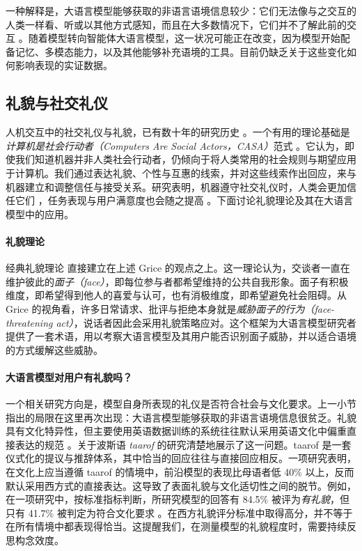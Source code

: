 一种解释是，大语言模型能够获取的非语言语境信息较少：它们无法像与之交互的人类一样看、听或以其他方式感知，而且在大多数情况下，它们并不了解此前的交互 \citep{vandermeulen2025properly}。随着模型转向智能体大语言模型，这一状况可能正在改变，因为模型开始配备记忆、多模态能力，以及其他能够补充语境的工具。目前仍缺乏关于这些变化如何影响表现的实证数据。

\subsection{礼貌与社交礼仪}
人机交互中的社交礼仪与礼貌，已有数十年的研究历史 \citep{ribino2023role}。一个有用的理论基础是\emph{计算机是社会行动者（Computers Are Social Actors，CASA）}范式 \citep{nass1994computers}。它认为，即使我们知道机器并非人类社会行动者，仍倾向于将人类常用的社会规则与期望应用于计算机。我们通过表达礼貌、个性与互惠的线索，并对这些线索作出回应，来与机器建立和调整信任与接受关系。研究表明，机器遵守社交礼仪时，人类会更加信任它们 \citep{miller2005}，任务表现与用户满意度也会随之提高 \citep{miyamoto2021}。下面讨论礼貌理论及其在大语言模型中的应用。

\paragraph{礼貌理论}
经典礼貌理论 \citep[例如][]{brown1987politeness}直接建立在上述 Grice 的观点之上。这一理论认为，交谈者一直在维护彼此的\emph{面子（face）}，即每位参与者都希望维持的公共自我形象。面子有积极维度，即希望得到他人的喜爱与认可，也有消极维度，即希望避免社会阻碍。从 Grice 的视角看，许多日常请求、批评与拒绝本身就是\emph{威胁面子的行为（face-threatening act）}，说话者因此会采用礼貌策略应对。这个框架为大语言模型研究者提供了一套术语，用以考察大语言模型及其用户能否识别面子威胁，并以适合语境的方式缓解这些威胁。

\paragraph{大语言模型对用户有礼貌吗？}
一个相关研究方向是，模型自身所表现的礼仪是否符合社会与文化要求。上一小节指出的局限在这里再次出现：大语言模型能够获取的非语言语境信息很贫乏。礼貌具有文化特异性，但主要使用英语数据训练的系统往往默认采用英语文化中偏重直接表达的规范 \citep{havaldar2023comparing}。关于波斯语 \emph{taarof} 的研究清楚地展示了这一问题。taarof 是一套仪式化的提议与推辞体系，其中恰当的回应往往与直接回应相反。一项研究表明，在文化上应当遵循 taarof 的情境中，前沿模型的表现比母语者低 40\% 以上，反而默认采用西方式的直接表达。这导致了表面礼貌与文化适切性之间的脱节。例如，在一项研究中，按标准指标判断，所研究模型的回答有 84.5\% 被评为{\em 有礼貌}，但只有 41.7\% 被判定为符合文化要求 \citep{goharisadr2025taarof}。在西方礼貌评分标准中取得高分，并不等于在所有情境中都表现得恰当。这提醒我们，在测量模型的礼貌程度时，需要持续反思构念效度。

